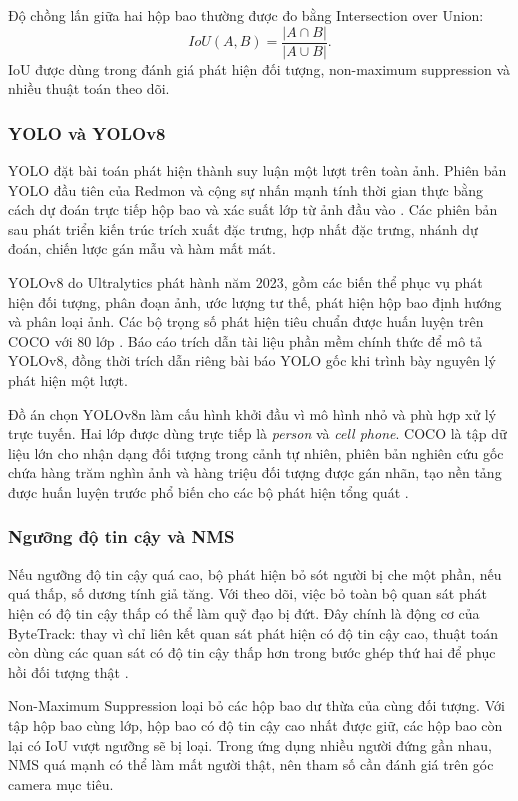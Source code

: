 Độ chồng lấn giữa hai hộp bao thường được đo bằng Intersection over Union:
\begin{equation}
 IoU(A,B)=\frac{|A\cap B|}{|A\cup B|}.
 \label{eq:iou}
\end{equation}
IoU được dùng trong đánh giá phát hiện đối tượng, non-maximum suppression và nhiều thuật toán theo dõi.

\subsubsection{YOLO và YOLOv8}
YOLO đặt bài toán phát hiện thành suy luận một lượt trên toàn ảnh. Phiên bản YOLO đầu tiên của Redmon và cộng sự nhấn mạnh tính thời gian thực bằng cách dự đoán trực tiếp hộp bao và xác suất lớp từ ảnh đầu vào \cite{yolo}. Các phiên bản sau phát triển kiến trúc trích xuất đặc trưng, hợp nhất đặc trưng, nhánh dự đoán, chiến lược gán mẫu và hàm mất mát.

YOLOv8 do Ultralytics phát hành năm 2023, gồm các biến thể phục vụ phát hiện đối tượng, phân đoạn ảnh, ước lượng tư thế, phát hiện hộp bao định hướng và phân loại ảnh. Các bộ trọng số phát hiện tiêu chuẩn được huấn luyện trên COCO với 80 lớp \cite{ultralyticsv8}. Báo cáo trích dẫn tài liệu phần mềm chính thức để mô tả YOLOv8, đồng thời trích dẫn riêng bài báo YOLO gốc khi trình bày nguyên lý phát hiện một lượt.

Đồ án chọn YOLOv8n làm cấu hình khởi đầu vì mô hình nhỏ và phù hợp xử lý trực tuyến. Hai lớp được dùng trực tiếp là \textit{person} và \textit{cell phone}. COCO là tập dữ liệu lớn cho nhận dạng đối tượng trong cảnh tự nhiên, phiên bản nghiên cứu gốc chứa hàng trăm nghìn ảnh và hàng triệu đối tượng được gán nhãn, tạo nền tảng được huấn luyện trước phổ biến cho các bộ phát hiện tổng quát \cite{coco}.

\subsubsection{Ngưỡng độ tin cậy và NMS}
Nếu ngưỡng độ tin cậy quá cao, bộ phát hiện bỏ sót người bị che một phần, nếu quá thấp, số dương tính giả tăng. Với theo dõi, việc bỏ toàn bộ quan sát phát hiện có độ tin cậy thấp có thể làm quỹ đạo bị đứt. Đây chính là động cơ của ByteTrack: thay vì chỉ liên kết quan sát phát hiện có độ tin cậy cao, thuật toán còn dùng các quan sát có độ tin cậy thấp hơn trong bước ghép thứ hai để phục hồi đối tượng thật \cite{bytetrack}.

Non-Maximum Suppression loại bỏ các hộp bao dư thừa của cùng đối tượng. Với tập hộp bao cùng lớp, hộp bao có độ tin cậy cao nhất được giữ, các hộp bao còn lại có IoU vượt ngưỡng sẽ bị loại. Trong ứng dụng nhiều người đứng gần nhau, NMS quá mạnh có thể làm mất người thật, nên tham số cần đánh giá trên góc camera mục tiêu.

